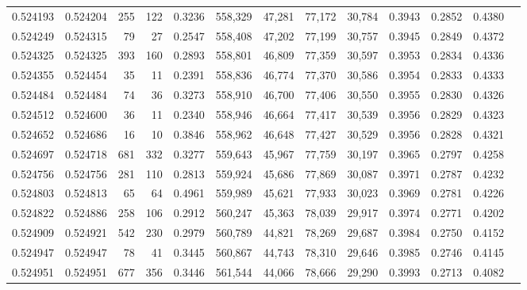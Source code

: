 \begin{tabular}{rrrrrrrrrrrrr}
0.524193 & 0.524204 &   255 &   122 &                                     0.3236 & 558,329 &  47,281 &  77,172 &  30,784 & 0.3943 & 0.2852 & 0.4380 \\
0.524249 & 0.524315 &    79 &    27 &                                     0.2547 & 558,408 &  47,202 &  77,199 &  30,757 & 0.3945 & 0.2849 & 0.4372 \\
0.524325 & 0.524325 &   393 &   160 &                                     0.2893 & 558,801 &  46,809 &  77,359 &  30,597 & 0.3953 & 0.2834 & 0.4336 \\
0.524355 & 0.524454 &    35 &    11 &                                     0.2391 & 558,836 &  46,774 &  77,370 &  30,586 & 0.3954 & 0.2833 & 0.4333 \\
0.524484 & 0.524484 &    74 &    36 &                                     0.3273 & 558,910 &  46,700 &  77,406 &  30,550 & 0.3955 & 0.2830 & 0.4326 \\
0.524512 & 0.524600 &    36 &    11 &                                     0.2340 & 558,946 &  46,664 &  77,417 &  30,539 & 0.3956 & 0.2829 & 0.4323 \\
0.524652 & 0.524686 &    16 &    10 &                                     0.3846 & 558,962 &  46,648 &  77,427 &  30,529 & 0.3956 & 0.2828 & 0.4321 \\
0.524697 & 0.524718 &   681 &   332 &                                     0.3277 & 559,643 &  45,967 &  77,759 &  30,197 & 0.3965 & 0.2797 & 0.4258 \\
0.524756 & 0.524756 &   281 &   110 &                                     0.2813 & 559,924 &  45,686 &  77,869 &  30,087 & 0.3971 & 0.2787 & 0.4232 \\
0.524803 & 0.524813 &    65 &    64 &                                     0.4961 & 559,989 &  45,621 &  77,933 &  30,023 & 0.3969 & 0.2781 & 0.4226 \\
0.524822 & 0.524886 &   258 &   106 &                                     0.2912 & 560,247 &  45,363 &  78,039 &  29,917 & 0.3974 & 0.2771 & 0.4202 \\
0.524909 & 0.524921 &   542 &   230 &                                     0.2979 & 560,789 &  44,821 &  78,269 &  29,687 & 0.3984 & 0.2750 & 0.4152 \\
0.524947 & 0.524947 &    78 &    41 &                                     0.3445 & 560,867 &  44,743 &  78,310 &  29,646 & 0.3985 & 0.2746 & 0.4145 \\
0.524951 & 0.524951 &   677 &   356 &                                     0.3446 & 561,544 &  44,066 &  78,666 &  29,290 & 0.3993 & 0.2713 & 0.4082 \\

\end{tabular}
